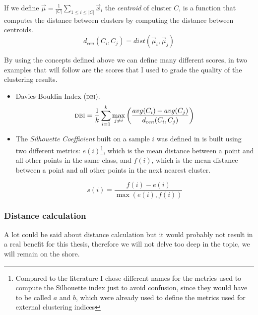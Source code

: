 If we define $\vec{\mu} = \frac{1}{|C|} \sum_{1 \leq i \leq |C|} \vec{x}_i$ the \emph{centroid} of
cluster $C$,  is a function that computes the distance between
clusters by computing the distance between centroids.
\begin{equation}
	\label{eq:cluster-centroid-distance}
	d_{cen}(C_i, C_j) = dist(\vec{\mu}_i, \vec{\mu}_j)
\end{equation}

By using the concepts defined above we can define many different scores, in two examples that will
follow are the scores that I used to grade the quality of the clustering results.

\begin{itemize}
	\item Davies-Bouldin Index (\textsc{dbi})\cite{bouldin1979}.
		\begin{equation*}
			\textsc{dbi} = \frac{1}{k}\sum_{i = 1}^k\max_{j \neq i}\left(\frac{avg(C_i) + avg(C_j)}{d_{cen}(C_i, C_j)}\right)
		\end{equation*}
	\item The \emph{Silhouette Coefficient} built on a sample $i$ was defined in \cite{rousseuw1987}
		is built using two different metrics: $e(i)$\footnote{Compared to the literature I
		chose different names for the metrics used to compute the Silhouette index just to
		avoid confusion, since they would have to be called $a$ and $b$, which were already
		used to define the metrics used for external clustering indices}, which is the mean
		distance between a point and all other points in the same class, and $f(i)$, which is
		the mean distance between a point and all other points in the next nearest cluster.

		\begin{equation*}
			s(i) = \frac{f(i) - e(i)}{\max(e(i), f(i))}
		\end{equation*}
\end{itemize}

\subsubsection{Distance calculation}
\label{ssec:distance-calculation}
A lot could be said about distance calculation but it would probably not result in a real benefit
for this thesis, therefore we will not delve too deep in the topic, we will remain on the shore.

